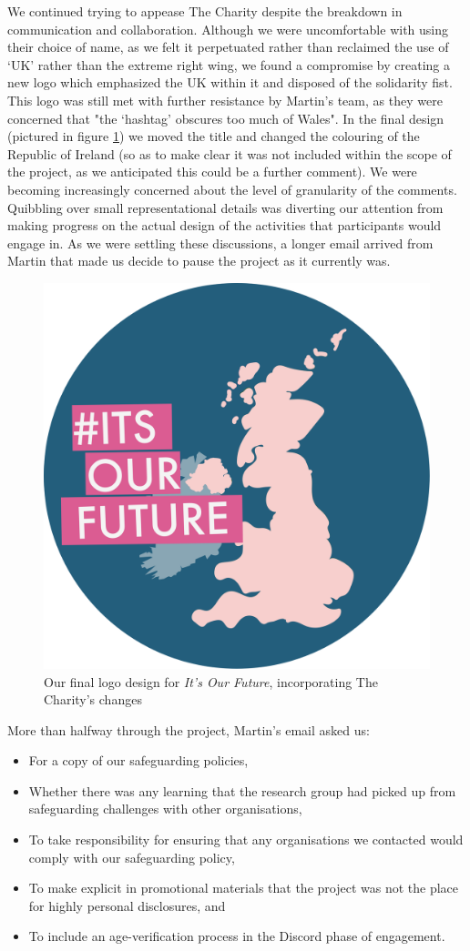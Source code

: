 We continued trying to appease The Charity despite the breakdown in communication and collaboration. Although we were uncomfortable with using their choice of name, as we felt it perpetuated rather than reclaimed the use of ‘UK’ rather than the extreme right wing, we found a compromise by creating a new logo which emphasized the UK within it and disposed of the solidarity fist.  This logo was still met with further resistance by Martin's team, as they were concerned that "the ‘hashtag’ obscures too much of Wales". In the final design (pictured in figure \ref{fig:iof-logo-2}) we moved the title and changed the colouring of the Republic of Ireland (so as to make clear it was not included within the scope of the project, as we anticipated this could be a further comment). We were becoming increasingly concerned about the level of granularity of the comments. Quibbling over small representational details was diverting our attention from making progress on the actual design of the activities that participants would engage in. As we were settling these discussions, a longer email arrived from Martin that made us decide to pause the project as it currently was.
\begin{figure}
    \centering
    \includegraphics[width=0.25\linewidth]{Images/7/iof-logo-2.png}
    \caption{Our final logo design for \textit{It's Our Future}, incorporating The Charity's changes}
    \label{fig:iof-logo-2}
\end{figure}
More than halfway through the project, Martin's email asked us:
\begin{itemize}
\item For a copy of our safeguarding policies,
\item Whether there was any learning that the research group had picked up from safeguarding challenges with other organisations,
\item To take responsibility for ensuring that any organisations we contacted would comply with our safeguarding policy,
\item To make explicit in promotional materials that the project was not the place for highly personal disclosures, and
\item To include an age-verification process in the Discord phase of engagement.
\end{itemize}

